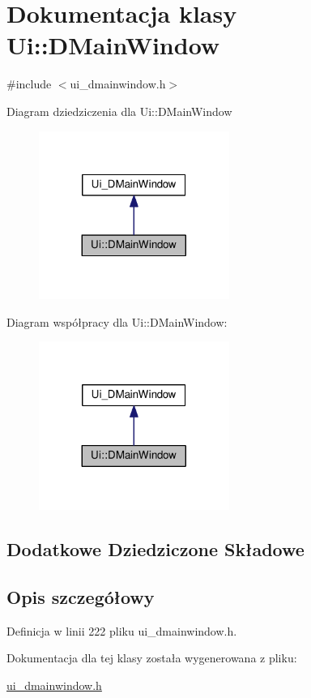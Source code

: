 \hypertarget{class_ui_1_1_d_main_window}{\section{Dokumentacja klasy Ui\-:\-:D\-Main\-Window}
\label{class_ui_1_1_d_main_window}
}


{\ttfamily \#include $<$ui\-\_\-dmainwindow.\-h$>$}



Diagram dziedziczenia dla Ui\-:\-:D\-Main\-Window\nopagebreak
\begin{figure}[H]
\begin{center}
\leavevmode
\includegraphics[width=176pt]{class_ui_1_1_d_main_window__inherit__graph}
\end{center}
\end{figure}


Diagram współpracy dla Ui\-:\-:D\-Main\-Window\-:\nopagebreak
\begin{figure}[H]
\begin{center}
\leavevmode
\includegraphics[width=176pt]{class_ui_1_1_d_main_window__coll__graph}
\end{center}
\end{figure}
\subsection*{Dodatkowe Dziedziczone Składowe}


\subsection{Opis szczegółowy}


Definicja w linii 222 pliku ui\-\_\-dmainwindow.\-h.



Dokumentacja dla tej klasy została wygenerowana z pliku\-:\begin{DoxyCompactItemize}
\item 
\hyperlink{ui__dmainwindow_8h}{ui\-\_\-dmainwindow.\-h}\end{DoxyCompactItemize}
